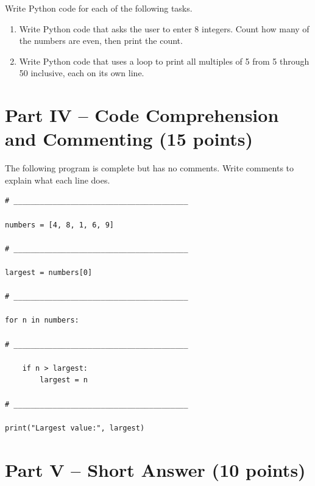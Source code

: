 \documentclass[12pt]{article}
\begin{document}
Write Python code for each of the following tasks.

\begin{enumerate}[resume,label=\arabic*.]
    \item Write Python code that asks the user to enter 8 integers. Count how many of the numbers are even, then print the count.

    \vspace{11cm}

\newpage

    \item Write Python code that uses a loop to print all multiples of 5 from 5 through 50 inclusive, each on its own line.

    \vspace{8cm}
\end{enumerate}

\newpage

\section*{Part IV -- Code Comprehension and Commenting (15 points)}

The following program is complete but has no comments. Write comments to explain what each line does.

\begin{lstlisting}
# ________________________________________

numbers = [4, 8, 1, 6, 9]

# ________________________________________

largest = numbers[0]

# ________________________________________

for n in numbers:

# ________________________________________

    if n > largest:
        largest = n

# ________________________________________

print("Largest value:", largest)
\end{lstlisting}

\vspace{3cm}

\newpage

\section*{Part V -- Short Answer (10 points)}
\end{document}
